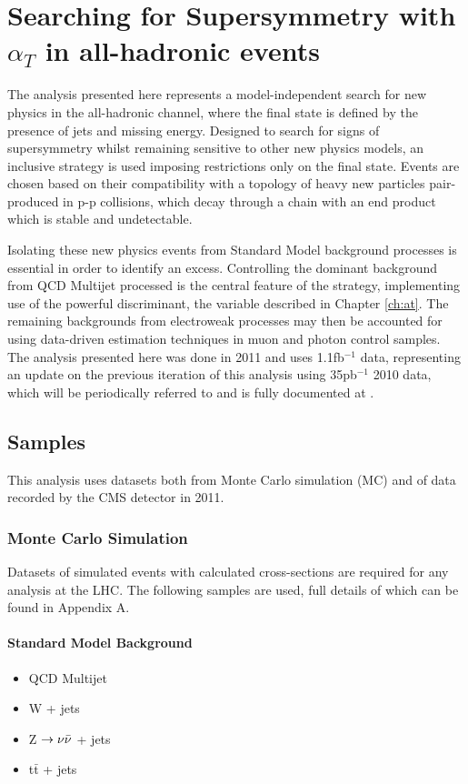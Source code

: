 \chapter{Searching for Supersymmetry with $\alpha_{T}$ in all-hadronic events}
The analysis presented here represents a model-independent search for new physics in the all-hadronic channel, where the final state is defined by the presence of jets and missing energy. Designed to search for signs of supersymmetry whilst remaining sensitive to other new physics models, an inclusive strategy is used imposing restrictions only on the final state. Events are chosen based on their compatibility with a topology of heavy new particles pair-produced in p-p collisions, which decay through a chain with an end product which is stable and undetectable.

Isolating these new physics events from Standard Model background processes is essential in order to identify an excess. Controlling the dominant background from QCD Multijet processed is the central feature of the strategy, implementing use of the powerful discriminant, the \alt variable described in Chapter \ref{ch:at}. The remaining backgrounds from electroweak processes may then be accounted for using data-driven estimation techniques in muon and photon control samples. The analysis presented here was done in 2011 and uses 1.1fb$^{-1}$ data, representing an update on the previous iteration of this analysis using 35pb$^{-1}$ 2010 data, which will be periodically referred to and is fully documented at \cite{35paper}.



\section{Samples}
This analysis uses datasets both from Monte Carlo simulation (MC) and of data recorded by the CMS detector in 2011.

\subsection{Monte Carlo Simulation}
Datasets of simulated events with calculated cross-sections are required for any analysis at the LHC. The following samples are used, full details of which can be found in Appendix A.
\subsubsection{Standard Model Background}
\begin{itemize}
\item QCD Multijet
\item W + jets
\item Z $\rightarrow \nu\bar{\nu}$ + jets
\item t$\bar{\textrm{t}}$ + jets
\end{itemize}

